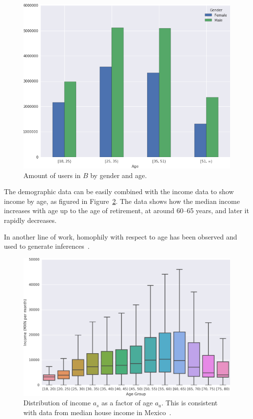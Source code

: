 \begin{figure}
\centering
\includegraphics[width=0.75\columnwidth]{figures/gender_age_bar3/gender_age_bar3.png}
\caption{Amount of users in $B$ by gender and age.}
\label{fig:gender_age_bar}
\end{figure}

The demographic data can be easily combined with the income data to show income by age, as figured in Figure~\ref{fig:income_age_boxplot}. The data shows how the median income increases with age up to the age of retirement, at around 60--65 years, and later it rapidly decreases.

In another line of work, homophily with respect to age has been observed and used to generate inferences~\cite{brea2014}.

\begin{figure}
\centering
\includegraphics[width=0.75\columnwidth]{figures/income_age_boxplot4/income_age_boxplot4.png}
\caption{Distribution of income $a_s$ as a factor of age $a_a$. This is consistent with data from median house income in Mexico~\cite{gallup2013}.}
\label{fig:income_age_boxplot}
\end{figure}

